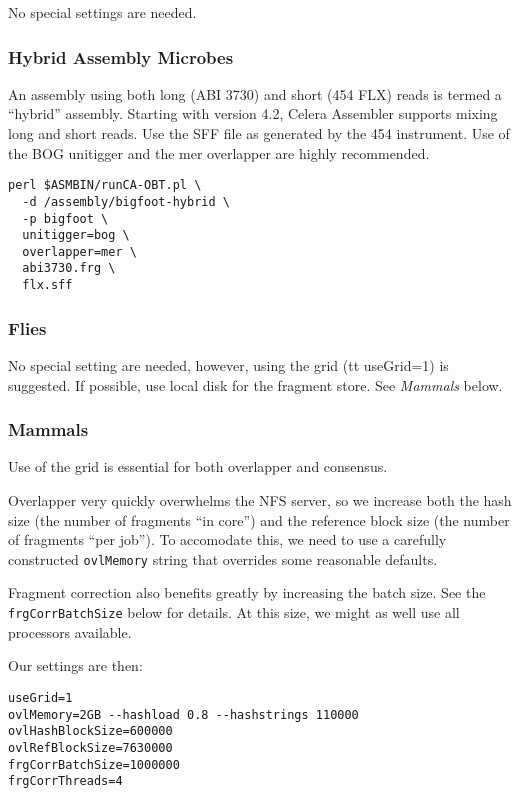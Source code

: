 \documentclass[twoside,11pt]{article}
\begin{document}
No special settings are needed.

\subsubsection{Hybrid Assembly Microbes}

An assembly using both long (ABI 3730) and short (454 FLX) reads is
termed a ``hybrid'' assembly.  Starting with version 4.2, Celera
Assembler supports mixing long and short reads.  Use the SFF file as
generated by the 454 instrument.  Use of the BOG unitigger and the mer
overlapper are highly recommended.

\begin{verbatim}
perl $ASMBIN/runCA-OBT.pl \
  -d /assembly/bigfoot-hybrid \
  -p bigfoot \
  unitigger=bog \
  overlapper=mer \
  abi3730.frg \
  flx.sff
\end{verbatim}

\subsubsection{Flies}

No special setting are needed, however, using the grid ({tt
useGrid=1}) is suggested.  If possible, use local disk for the
fragment store.  See {\em Mammals} below.

\subsubsection{Mammals}

Use of the grid is essential for both overlapper and consensus.

Overlapper very quickly overwhelms the NFS server, so we increase both
the hash size (the number of fragments ``in core'') and the reference
block size (the number of fragments ``per job'').  To accomodate this,
we need to use a carefully constructed {\tt ovlMemory} string that
overrides some reasonable defaults.

Fragment correction also benefits greatly by increasing the batch
size.  See the {\tt frgCorrBatchSize} below for details.  At this
size, we might as well use all processors available.

Our settings are then:

\begin{verbatim}
useGrid=1
ovlMemory=2GB --hashload 0.8 --hashstrings 110000
ovlHashBlockSize=600000
ovlRefBlockSize=7630000
frgCorrBatchSize=1000000
frgCorrThreads=4
\end{verbatim}
\end{document}
